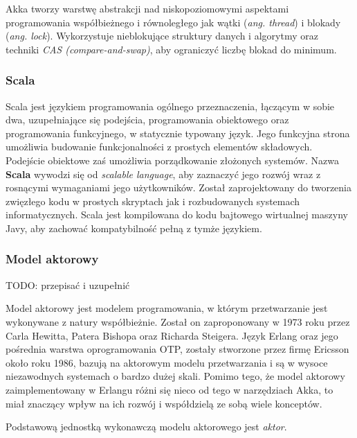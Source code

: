 Akka tworzy warstwę abstrakcji nad niskopoziomowymi aspektami programowania współbieżnego i równoległego jak wątki (\emph{ang. thread}) i blokady (\emph{ang. lock}). Wykorzystuje nieblokujące struktury danych i algorytmy oraz techniki \emph{CAS (compare-and-swap)}, aby ograniczyć liczbę blokad do minimum.

\subsubsection{Scala}\label{scala}

Scala \autocite{odersky2008scala} jest językiem programowania ogólnego przeznaczenia, łączącym w sobie dwa, uzupełniające się podejścia, programowania obiektowego oraz programowania funkcyjnego, w statycznie typowany język. Jego funkcyjna strona umożliwia budowanie funkcjonalności z prostych elementów składowych. Podejście obiektowe zaś umożliwia porządkowanie złożonych systemów. Nazwa \textbf{Scala} wywodzi się od \emph{scalable language}, aby zaznaczyć jego rozwój wraz z rosnącymi wymaganiami jego użytkowników. Został zaprojektowany do tworzenia zwięzłego kodu w prostych skryptach jak i rozbudowanych systemach informatycznych. Scala jest kompilowana do kodu bajtowego wirtualnej maszyny Javy, aby zachować kompatybilność pełną z tymże językiem.

\subsubsection{\texorpdfstring{Model aktorowy \autocite{todd:2012:simulation} \autocite{barat:2017:simulation} \autocite{aceto:2011:simulations} \autocite{Waite2013ScaNSU} \autocite{Harrison:2015:actors}}{Model aktorowy     }}\label{model-aktorowy}

TODO: przepisać i uzupełnić

Model aktorowy jest modelem programowania, w którym przetwarzanie jest wykonywane z natury współbieżnie.
Został on zaproponowany w 1973 roku przez Carla Hewitta, Patera Bishopa oraz Richarda Steigera. Język Erlang oraz jego pośrednia warstwa oprogramowania OTP, zostały stworzone przez firmę Ericsson około roku 1986, bazują na aktorowym modelu przetwarzania i są w wysoce niezawodnych systemach o bardzo dużej skali. Pomimo tego, że model aktorowy zaimplementowany w Erlangu różni się nieco od tego w narzędziach Akka, to miał znaczący wpływ na ich rozwój i współdzielą ze sobą wiele konceptów.

Podstawową jednostką wykonawczą modelu aktorowego jest \emph{aktor}.

